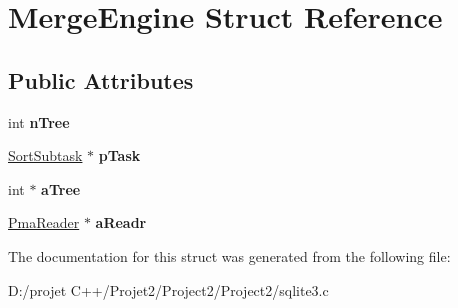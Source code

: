 \hypertarget{struct_merge_engine}{}\section{Merge\+Engine Struct Reference}
\label{struct_merge_engine}
\subsection*{Public Attributes}
\begin{DoxyCompactItemize}
\item 
\mbox{\label{struct_merge_engine_a48d8ad99ae5063e96458b5563ff2bbd3}} 
int {\bfseries n\+Tree}
\item 
\mbox{\label{struct_merge_engine_a0a366796f579aa7befcb2683ff767c0d}} 
\mbox{\hyperlink{struct_sort_subtask}{Sort\+Subtask}} $\ast$ {\bfseries p\+Task}
\item 
\mbox{\label{struct_merge_engine_aac39bb928db1c72c48db263e0937b285}} 
int $\ast$ {\bfseries a\+Tree}
\item 
\mbox{\label{struct_merge_engine_a897688db3212c8b3049a57cda6f2f975}} 
\mbox{\hyperlink{struct_pma_reader}{Pma\+Reader}} $\ast$ {\bfseries a\+Readr}
\end{DoxyCompactItemize}


The documentation for this struct was generated from the following file\+:\begin{DoxyCompactItemize}
\item 
D\+:/projet C++/\+Projet2/\+Project2/\+Project2/sqlite3.\+c\end{DoxyCompactItemize}
